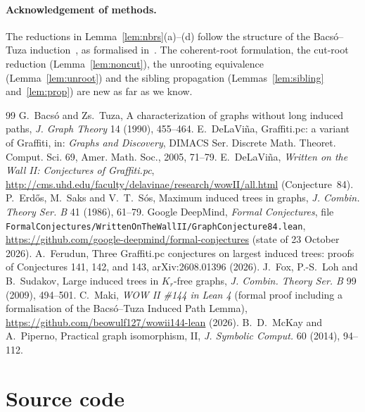 \documentclass[11pt,a4paper]{article}
\theoremstyle{definition}
\begin{document}
\paragraph{Acknowledgement of methods.} The reductions in Lemma~\ref{lem:nbrs}(a)--(d) follow the structure of the Bacs\'o--Tuza induction~\cite{BT90}, as formalised in~\cite{Mak}. The coherent-root formulation, the cut-root reduction (Lemma~\ref{lem:noncut}), the unrooting equivalence (Lemma~\ref{lem:unroot}) and the sibling propagation (Lemmas~\ref{lem:sibling} and~\ref{lem:prop}) are new as far as we know.

\begin{thebibliography}{99}
 G.~Bacs\'o and Zs.~Tuza, A characterization of graphs without long induced paths, \emph{J. Graph Theory} 14 (1990), 455--464.
 E.~DeLaVi\~na, Graffiti.pc: a variant of Graffiti, in: \emph{Graphs and Discovery}, DIMACS Ser. Discrete Math. Theoret. Comput. Sci. 69, Amer. Math. Soc., 2005, 71--79.
 E.~DeLaVi\~na, \emph{Written on the Wall II: Conjectures of Graffiti.pc}, \url{http://cms.uhd.edu/faculty/delavinae/research/wowII/all.html} (Conjecture~84).
 P.~Erd\H{o}s, M.~Saks and V.~T.~S\'os, Maximum induced trees in graphs, \emph{J. Combin. Theory Ser. B} 41 (1986), 61--79.
 Google DeepMind, \emph{Formal Conjectures}, file \nolinkurl{FormalConjectures/WrittenOnTheWallII/GraphConjecture84.lean}, \url{https://github.com/google-deepmind/formal-conjectures} (state of 23 October 2026).
 A.~Ferudun, Three Graffiti.pc conjectures on largest induced trees: proofs of Conjectures 141, 142, and 143, arXiv:2608.01396 (2026).
 J.~Fox, P.-S.~Loh and B.~Sudakov, Large induced trees in $K_r$-free graphs, \emph{J. Combin. Theory Ser. B} 99 (2009), 494--501.
 C.~Maki, \emph{WOW II \#144 in Lean 4} (formal proof including a formalisation of the Bacs\'o--Tuza Induced Path Lemma), \url{https://github.com/beowulf127/wowii144-lean} (2026).
 B.~D.~McKay and A.~Piperno, Practical graph isomorphism, II, \emph{J. Symbolic Comput.} 60 (2014), 94--112.
\end{thebibliography}

\appendix
\section{Source code}\label{app:code}
\end{document}
